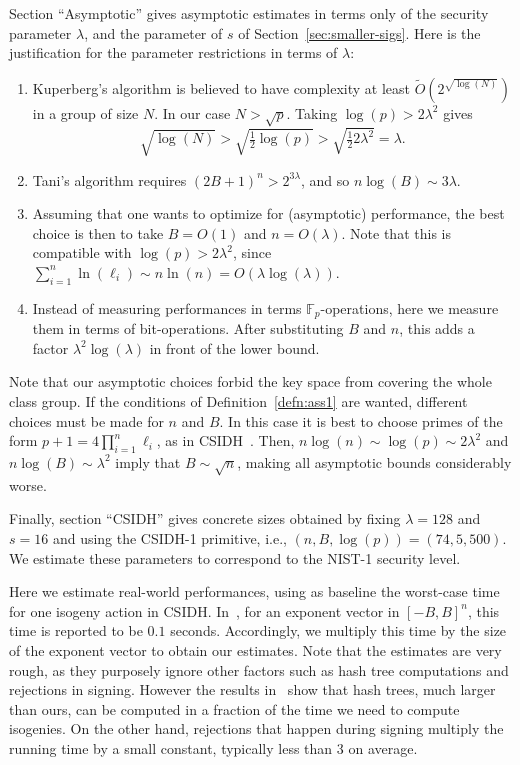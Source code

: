 \documentclass{llncs}
\newcommand{\F}{\mathbb{F}}
\begin{document}
Section ``Asymptotic'' gives asymptotic estimates in terms only of the security parameter $\lambda$, and the parameter of $s$ of Section~\ref{sec:smaller-sigs}.
Here is the justification for the parameter restrictions in terms of $\lambda$:
\begin{enumerate}
\item Kuperberg's algorithm is believed to have complexity at least $\tilde{O}( 2^{\sqrt{\log(N)}} )$ in a group of size $N$. In our case $N > \sqrt{p}$. Taking $\log(p) > 2 \lambda^2$ gives 
\[
   \sqrt{ \log(N)} > \sqrt{ \tfrac{1}{2} \log(p) } > \sqrt{ \tfrac{1}{2} 2 \lambda^2 } = \lambda.
\]
\item Tani's algorithm requires $(2B+1)^n > 2^{3 \lambda}$, and so $n \log(B) \sim 3 \lambda$.
\item Assuming that one wants to optimize for (asymptotic) performance, the best choice is then to take $B=O(1)$ and $n=O(\lambda)$. Note that this is compatible with $\log(p)>2\lambda^2$, since $\sum_{i=1}^n\ln(\ell_i)\sim n\ln(n) = O(\lambda\log(\lambda))$.
\item Instead of measuring performances in terms $\F_p$-operations, here we measure them in terms of bit-operations. After substituting $B$ and $n$, this adds a factor $\lambda^2\log(\lambda)$ in front of the lower bound.
\end{enumerate}

Note that our asymptotic choices forbid the key space from covering the whole class group.
If the conditions of Definition~\ref{defn:ass1} are wanted, different choices must be made for $n$ and $B$.
In this case it is best to choose primes of the form $p+1 = 4\prod_{i=1}^n\ell_i$, as in CSIDH~\cite{CLMPR18}.
Then, $n\log(n)\sim\log(p)\sim 2\lambda^2$ and $n\log(B)\sim\lambda^2$ imply that $B\sim\sqrt{n}$, making all asymptotic bounds considerably worse.

Finally, section ``CSIDH'' gives concrete sizes obtained by fixing $\lambda=128$ and $s=16$ and using the CSIDH-1 primitive, i.e., $(n,B,\log(p)) = (74,5,500)$.
We estimate these parameters to correspond to the NIST-1 security level.

Here we estimate real-world performances, using as baseline the worst-case time for one isogeny action in CSIDH.
In~\cite{CLMPR18}, for an exponent vector in $[-B,B]^n$, this time is reported to be $0.1$ seconds.
Accordingly, we multiply this time by the size of the exponent vector to obtain our estimates.
Note that the estimates are very rough, as they purposely ignore other factors such as hash tree computations and rejections in signing.
However the results in~\cite{10.1007/978-3-662-49384-7_15,sphincs+} show that hash trees, much larger than ours, can be computed in a fraction of the time we need to compute isogenies.
On the other hand, rejections that happen during signing multiply the running time by a small constant, typically less than $3$ on average.
\end{document}
